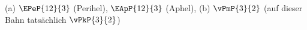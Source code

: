 (a) $\EPeP{12}{3}$ (Perihel), $\EApP{12}{3}$ (Aphel), (b) $\vPmP{3}{2}$ (auf dieser Bahn tatsächlich $\vPkP{3}{2}$)
